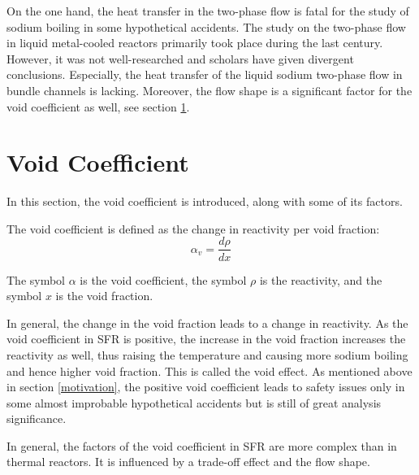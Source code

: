 \documentclass{article}
\begin{document}
On the one hand, the heat transfer in the two-phase flow is fatal for the study of sodium boiling in some hypothetical accidents. The study on the two-phase flow in liquid metal-cooled reactors primarily took place during the last century. However, it was not well-researched and scholars have given divergent conclusions. Especially, the heat transfer of the liquid sodium two-phase flow in bundle channels is lacking. \cite{wuReviewHeatTransfer2018} Moreover, the flow shape is a significant factor for the void coefficient as well, see section \ref{Void Coefficient}. 


\section{Void Coefficient}
\label{Void Coefficient}
In this section, the void coefficient is introduced, along with some of its factors.

The void coefficient is defined as the change in reactivity per void fraction:
\begin{equation*}
    \alpha_v = \frac{d\rho}{dx}
\end{equation*}

The symbol $\alpha$ is the void coefficient, the symbol $\rho$ is the reactivity, and the symbol $x$ is the void fraction.

In general, the change in the void fraction leads to a change in reactivity. As the void coefficient in SFR is positive, the increase in the void fraction increases the reactivity as well, thus raising the temperature and causing more sodium boiling and hence higher void fraction. This is called the void effect. As mentioned above in section \ref{motivation}, the positive void coefficient leads to safety issues only in some almost improbable hypothetical accidents but is still of great analysis significance. 

In general, the factors of the void coefficient in SFR are more complex than in thermal reactors. It is influenced by a trade-off effect and the flow shape.
\end{document}
